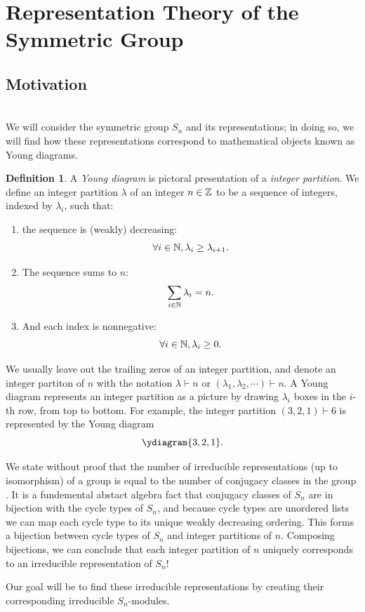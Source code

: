 \documentclass[12pt,twoside]{reedthesis}
\theoremstyle{plain}   %
\theoremstyle{definition}
\newtheorem{defn}{Definition}[section]
\theoremstyle{remark}
\numberwithin{equation}{section}
\begin{document}
  \section{Representation Theory of the Symmetric Group}
  \subsection{Motivation}\label{motivation} \hfill\\
  We will consider the symmetric group $S_n$ and its representations; in doing so, we will find how these representations correspond to mathematical objects known as Young diagrams.
  \begin{defn}
    A \emph{Young diagram} is pictoral presentation of a \emph{integer partition}.
    We define an integer partition $\lambda$ of an integer $n \in \mathbb{Z}$ to be a sequence of integers, indexed by $\lambda_i$, such that:
    \begin{enumerate}
    \item the sequence is (weakly) decreasing:
      \[\forall i \in \mathbb{N}, \lambda_i \geq \lambda_{i+1}.\]
    \item
      The sequence sums to $n$:
      \[ \sum_{i \in \mathbb{N}} \lambda_i = n. \]
    \item
      And each index is nonnegative:
      \[\forall i \in \mathbb{N}, \lambda_i \geq 0.\]
    \end{enumerate}
    We usually leave out the trailing zeros of an integer partition, and denote an integer partiton of $n$ with the notation $\lambda \vdash n$ or $(\lambda_1,\lambda_2,\cdots) \vdash n$.
    A Young diagram represents an integer partition as a picture by drawing $\lambda_i$ boxes in the $i$-th row, from top to bottom.
    For example, the integer partition $(3,2,1) \vdash 6$ is represented by the Young diagram
    \[
      \ydiagram{3,2,1}.
    \]
  \end{defn}
  \par
  We state without proof that the number of irreducible representations (up to isomorphism) of a group is equal to the number of conjugacy classes in
  the group \cite[Proposition 1.10.1]{sagan}. It is a fundemental abstact algebra fact that 
  conjugacy classes of $S_n$ are in bijection with the cycle types of $S_n$,
  and because cycle types are unordered lists we can map each cycle type to its unique weakly decreasing ordering.
  This forms a bijection between cycle types of $S_n$ and integer partitions of $n$.
  Composing bijections, we can conclude that each integer partition of $n$ uniquely corresponds to an irreducible representation of $S_n$! \par
  Our goal will be to find these irreducible representations by creating their corresponding irreducible $S_n$-modules.
\end{document}
